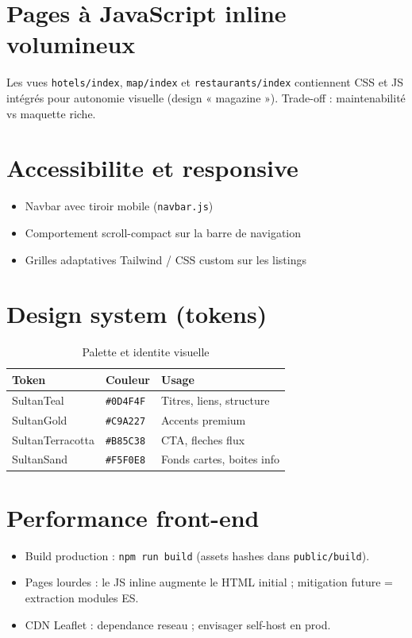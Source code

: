 \section{Pages à JavaScript inline volumineux}

Les vues \texttt{hotels/index}, \texttt{map/index} et \texttt{restaurants/index} contiennent CSS et JS intégrés pour autonomie visuelle (design « magazine »). Trade-off : maintenabilité vs maquette riche.

\section{Accessibilite et responsive}

\begin{itemize}
  \item Navbar avec tiroir mobile (\texttt{navbar.js})
  \item Comportement scroll-compact sur la barre de navigation
  \item Grilles adaptatives Tailwind / CSS custom sur les listings
\end{itemize}

\section{Design system (tokens)}

\begin{table}[H]
\centering
\caption{Palette et identite visuelle}
\begin{tabular}{@{}lll@{}}
\toprule
\textbf{Token} & \textbf{Couleur} & \textbf{Usage} \\
\midrule
SultanTeal & \texttt{\#0D4F4F} & Titres, liens, structure \\
SultanGold & \texttt{\#C9A227} & Accents premium \\
SultanTerracotta & \texttt{\#B85C38} & CTA, fleches flux \\
SultanSand & \texttt{\#F5F0E8} & Fonds cartes, boites info \\
\bottomrule
\end{tabular}
\end{table}

\section{Performance front-end}

\begin{itemize}
  \item Build production : \texttt{npm run build} (assets hashes dans \texttt{public/build}).
  \item Pages lourdes : le JS inline augmente le HTML initial ; mitigation future = extraction modules ES.
  \item CDN Leaflet : dependance reseau ; envisager self-host en prod.
\end{itemize}
